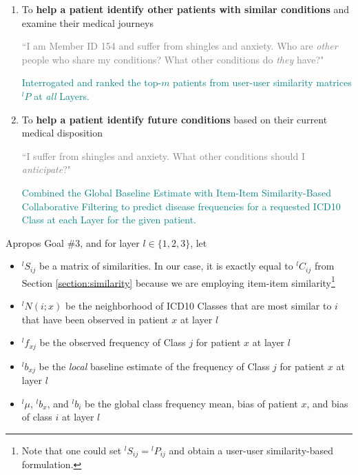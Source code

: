 \documentclass[twoside,11pt]{article}
\begin{document}
{\begin{enumerate}
\textcolor{gray}{``I have shingles. What other risks are associated with this condition?"}

\textcolor{teal}{\faHandORight \hspace{0.25em} Interrogated and ranked the top-$n$ conditions from an item-item similarity matrix ${}^{l}C$ at each level of a condition's rank in the Layer hierarchy. E.g., a Layer 3 condition would receive predictions for \textit{all} Layers 1, 2, and 3. A Layer 2 condition would receive predictions for only Layers 1 and 2.}

  \item To \textbf{help a patient identify other patients with similar conditions} and examine their medical journeys

\textcolor{gray}{``I am Member ID 154 and suffer from shingles and anxiety. Who are \textit{other} people who share my conditions? What other conditions do \textit{they} have?"}

\textcolor{teal}{\faHandORight \hspace{0.25em} Interrogated and ranked the top-$m$ patients from user-user similarity matrices ${}^{l}P$ at \textit{all} Layers.}

  \item To \textbf{help a patient identify future conditions} based on their current medical disposition

\textcolor{gray}{``I suffer from shingles and anxiety. What other conditions should I \textit{anticipate}?"}

\textcolor{teal}{\faHandORight \hspace{0.25em} Combined the Global Baseline Estimate with Item-Item Similarity-Based Collaborative Filtering to predict disease frequencies for a requested ICD10 Class at each Layer for the given patient.}

\end{enumerate}
\newpage
Apropos Goal \#3, and for layer $l \in \{1,2,3\}$, let
\begin{itemize}
  \item ${}^{l}S_{ij}$ be a matrix of similarities. In our case, it is exactly equal to ${}^{l}C_{ij}$ from Section \ref{section:similarity} because we are employing item-item similarity\footnote{Note that one could set ${}^{l}S_{ij} = {}^{l}P_{ij}$ and obtain a user-user similarity-based formulation.}
  \item ${}^{l}N(i; x)$ be the neighborhood of ICD10 Classes that are most similar to $i$ that have been observed in patient $x$ at layer $l$
  \item ${}^{l}f_{xj}$ be the observed frequency of Class $j$ for patient $x$ at layer $l$
  \item ${}^{l}b_{xj}$ be the \textit{local} baseline estimate of the frequency of Class $j$ for patient $x$ at layer $l$
  \item ${}^{l}\mu$, ${}^{l}b_x$, and ${}^{l}b_i$ be the global class frequency mean, bias of patient $x$, and bias of class $i$ at layer $l$
\end{itemize}

}
\end{document}
